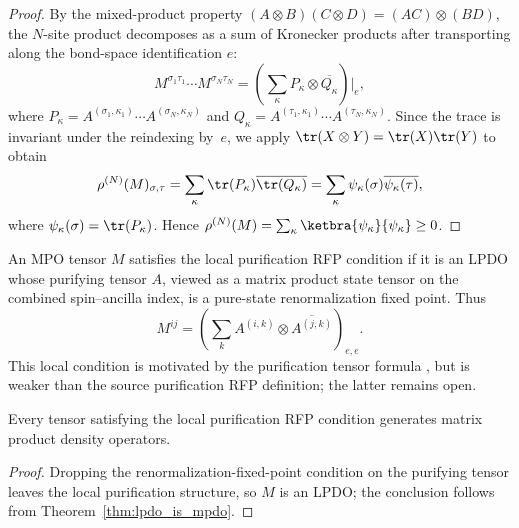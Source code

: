 \begin{proof}
    \leanok
    By the mixed-product property
    $(A \otimes B)(C \otimes D) = (AC) \otimes (BD)$, the $N$-site product
    decomposes as a sum of Kronecker products after transporting along the
    bond-space identification $e$:
    \[
        M^{\sigma_1 \tau_1} \cdots M^{\sigma_N \tau_N}
        = (\sum_{\kappa} P_\kappa \otimes \overline{Q_\kappa})
        \big|_{e},
    \]
    where $P_\kappa = A^{(\sigma_1,\kappa_1)} \cdots A^{(\sigma_N,\kappa_N)}$
    and $Q_\kappa = A^{(\tau_1,\kappa_1)} \cdots A^{(\tau_N,\kappa_N)}$.
    Since the trace is invariant under the reindexing by~$e$,
    we apply $\tr(X \otimes Y) = \tr(X)\tr(Y)$ to obtain
    \[
        \rho^{(N)}(M)_{\sigma,\tau}
        = \sum_\kappa \tr(P_\kappa) \overline{\tr(Q_\kappa)}
        = \sum_\kappa \psi_\kappa(\sigma) \overline{\psi_\kappa(\tau)},
    \]
    where $\psi_\kappa(\sigma) = \tr(P_\kappa)$.
    Hence $\rho^{(N)}(M) = \sum_\kappa \ketbra{\psi_\kappa}{\psi_\kappa} \ge 0$.
\end{proof}

\begin{definition}\label{def:is_local_purification_rfp}
    \leanok
    An MPO tensor $M$ satisfies the local purification RFP condition if it is an
    LPDO whose purifying tensor $A$, viewed as a matrix product state tensor on
    the combined spin--ancilla index, is a pure-state renormalization fixed point.
    Thus
    \[
        M^{ij}
        =
        \left(\sum_{k} A^{(i,k)} \otimes \overline{A^{(j,k)}}\right)_{e,e}.
    \]
    This local condition is motivated by the purification tensor formula
    \cite[lines~744--747]{Cirac2016MPDO_arXiv}, but is weaker than the source
    purification RFP definition; the latter remains open.
\end{definition}

\begin{theorem}
    \label{thm:local_purification_rfp_is_mpdo}
    \leanok
    Every tensor satisfying the local purification RFP condition generates
    matrix product density operators.
\end{theorem}

\begin{proof}\leanok
    Dropping the renormalization-fixed-point condition on the purifying tensor
    leaves the local purification structure, so $M$ is an LPDO; the conclusion
    follows from Theorem~\ref{thm:lpdo_is_mpdo}.
\end{proof}

